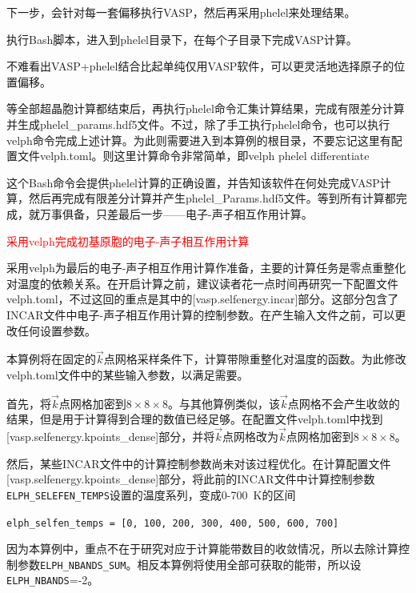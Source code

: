 {下一步，会针对每一套偏移执行\textrm{VASP}，然后再采用\textrm{phelel}来处理结果。

执行\textrm{Bash}脚本，进入到\textrm{phelel}目录下，在每个子目录下完成\textrm{VASP}计算。

不难看出\textrm{VASP+phelel}结合比起单纯仅用\textrm{VASP}软件，可以更灵活地选择原子的位置偏移。

等全部超晶胞计算都结束后，再执行\textrm{phelel}命令汇集计算结果，完成有限差分计算并生成\textrm{phelel\_params.hdf5}文件。不过，除了手工执行\textrm{phelel}命令，也可以执行\textrm{velph}命令完成上述计算。为此则需要进入到本算例的根目录，不要忘记这里有配置文件\textrm{velph.toml}。则这里计算命令非常简单，即\textrm{velph phelel differentiate}

这个\textrm{Bash}命令会提供\textrm{phelel}计算的正确设置，并告知该软件在何处完成\textrm{VASP}计算，然后再完成有限差分计算并产生\textrm{phelel\_Params.hdf5}文件。等到所有计算都完成，就万事俱备，只差最后一步——电子-声子相互作用计算。

\textcolor{red}{采用\textrm{velph}完成初基原胞的电子-声子相互作用计算}

采用\textrm{velph}为最后的电子-声子相互作用计算作准备，主要的计算任务是零点重整化对温度的依赖关系。在开启计算之前，建议读者花一点时间再研究一下配置文件\textrm{velph.toml}，不过这回的重点是其中的\textrm{[vasp.selfenergy.incar]}部分。这部分包含了\textrm{INCAR}文件中电子-声子相互作用计算的控制参数。在产生输入文件之前，可以更改任何设置参数。

本算例将在固定的$\vec k$点网格采样条件下，计算带隙重整化对温度的函数。为此修改\textrm{velph.toml}文件中的某些输入参数，以满足需要。

首先，将$\vec k$点网格加密到$8\times8\times8$。与其他算例类似，该$\vec k$点网格不会产生收敛的结果，但是用于计算得到合理的数值已经足够。在配置文件\textrm{velph.toml}中找到\textrm{[vasp.selfenergy.kpoints\_dense]}部分，并将$\vec k$点网格改为$\vec k$点网格加密到$8\times8\times8$。

然后，某些\textrm{INCAR}文件中的计算控制参数尚未对该过程优化。在计算配置文件\textrm{[vasp.selfenergy.kpoints\_dense]}部分，将此前的\textrm{INCAR}文件中计算控制参数\texttt{ELPH\_SELEFEN\_TEMPS}设置的温度系列，变成\textrm{0-700~K}的区间

\textrm{\texttt{elph\_selfen\_temps = [0, 100, 200, 300, 400, 500, 600, 700]}}

因为本算例中，重点不在于研究对应于计算能带数目的收敛情况，所以去除计算控制参数\texttt{ELPH\_NBANDS\_SUM}。相反本算例将使用全部可获取的能带，所以设\texttt{ELPH\_NBANDS}=-2。

}
